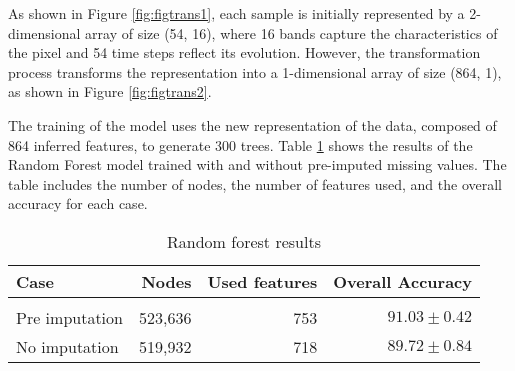 As shown in Figure \ref{fig:figtrans1}, each sample is initially represented by a 2-dimensional array of size (54, 16), where 16 bands capture the characteristics of the pixel and 54 time steps reflect its evolution. 
However, the transformation process transforms the representation into a 1-dimensional array of size (864, 1), as shown in Figure \ref{fig:figtrans2}. 

The training of the model uses the new representation of the data, composed of 864 inferred features, to generate 300 trees.
Table \ref{tab:rfresults} shows the results of the Random Forest model trained with and without pre-imputed missing values. 
The table includes the number of nodes, the number of features used, and the overall accuracy for each case.

\begin{table}[H]
  \centering
    \begin{tabular}{lrrr}
    Case                       & Nodes   & Used features & Overall Accuracy             \\[0.2cm] 
    \hline \\[-0.2cm]
    Pre imputation      & 523,636  & 753          & $91.03 \pm 0.42$\\
    No imputation       & 519,932  & 718          & $89.72 \pm 0.84$
    \end{tabular}
  \caption{Random forest results}
  \label{tab:rfresults}
\end{table}